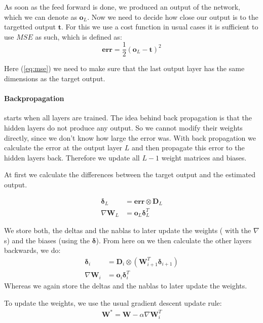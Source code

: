 As soon as the feed forward is done, we produced an output of the network, which we can denote as $\mathbf{o}_L$. Now we need to decide how close our output is to the targetted output $\mathbf{t}$. For this we use a cost function in usual cases it is sufficient to use $MSE$ as such, which is defined as:
\begin{equation}
\label{eq:mse}
\mathbf{err} = \frac{1}{2} \left( \mathbf{o}_L - \mathbf{t} \right) ^2
\end{equation}

Here (\ref{eq:mse}) we need to make sure that the last output layer has the same dimensions as the target output.


\paragraph{Backpropagation} starts when all layers are trained. The idea behind back propagation is that the hidden layers do not produce any output. So we cannot modify their weights directly, since we don’t know how large the error was. With back propagation we calculate the error at the output layer $L$ and then propagate this error to the hidden layers back. Therefore we update all $L-1$ weight matrices and biases.

At first we calculate the differences between the target output and the estimated output.

\begin{align}
\boldsymbol{\delta}_L &= \mathbf{err} \otimes \mathbf{D}_L\\
\nabla \mathbf{W}_L &= \mathbf{o}_L \boldsymbol{\delta}_L^T
\end{align}

We store both, the deltas and the nablas to later update the weights ( with the $\nabla$s) and the biases (using the $\mathbf{\delta}$).
From here on we then calculate the other layers backwards, we do:
\begin{align}
\boldsymbol{\delta}_i &= \mathbf{D}_i \otimes \left( \mathbf{W}_{i+1}^T \boldsymbol{\delta}_{i+1} \right)\\
\nabla \mathbf{W}_i &= \mathbf{o}_i \boldsymbol{\delta}_i^T
\end{align}
Whereas we again store the deltas and the nablas to later update the weights.

To update the weights, we use the usual gradient descent update rule:
\begin{align}
\mathbf{W}^{*} = \mathbf{W} - \alpha \nabla \mathbf{W}_i^T\\
\end{align}

